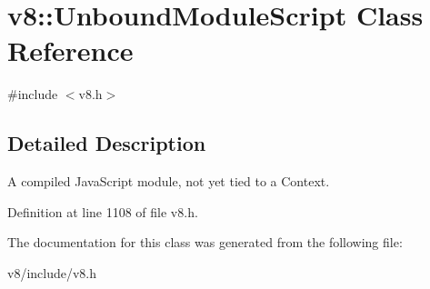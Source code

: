 \hypertarget{classv8_1_1UnboundModuleScript}{}\section{v8\+:\+:Unbound\+Module\+Script Class Reference}
\label{classv8_1_1UnboundModuleScript}


{\ttfamily \#include $<$v8.\+h$>$}



\subsection{Detailed Description}
A compiled Java\+Script module, not yet tied to a Context. 

Definition at line 1108 of file v8.\+h.



The documentation for this class was generated from the following file\+:\begin{DoxyCompactItemize}
\item 
v8/include/v8.\+h\end{DoxyCompactItemize}
